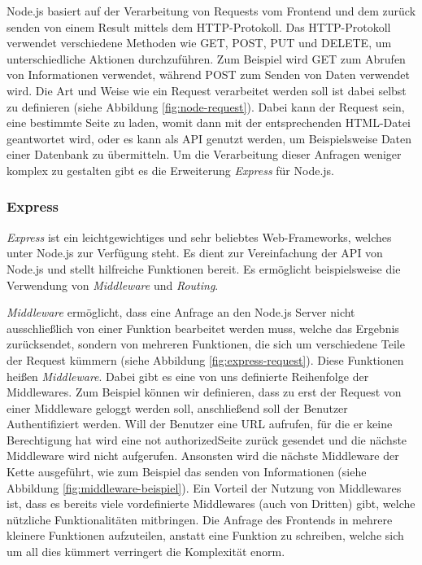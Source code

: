 \documentclass[a4paper,12pt]{report}
\newcommand{\footcite}[1]{\footnotemark\footnotetext{\cite{#1}}}
\begin{document}
Node.js basiert auf der Verarbeitung von Requests vom Frontend und dem zurück senden von einem Result mittels dem HTTP-Protokoll. Das HTTP-Protokoll verwendet verschiedene Methoden wie GET, POST, PUT und DELETE, um unterschiedliche Aktionen durchzuführen. Zum Beispiel wird GET zum Abrufen von Informationen verwendet, während POST zum Senden von Daten verwendet wird. Die Art und Weise wie ein Request verarbeitet werden soll ist dabei selbst zu definieren (siehe Abbildung \ref{fig:node-request}). Dabei kann der Request sein, eine bestimmte Seite zu laden, womit dann mit der entsprechenden HTML-Datei geantwortet wird, oder es kann als API genutzt werden, um Beispielsweise Daten einer Datenbank zu übermitteln. Um die Verarbeitung dieser Anfragen weniger komplex zu gestalten gibt es die Erweiterung \textit{Express} für Node.js.

\subsubsection{Express}
\label{sec:express}
\textit{Express} ist ein leichtgewichtiges und sehr beliebtes Web-Frameworks, welches unter Node.js zur Verfügung steht. Es dient zur Vereinfachung der API von Node.js und stellt hilfreiche Funktionen bereit\footcite{expressbook}. Es ermöglicht beispielsweise die Verwendung von \textit{Middleware} und \textit{Routing}.

\textit{Middleware} ermöglicht, dass eine Anfrage an den Node.js Server nicht ausschließlich von einer Funktion bearbeitet werden muss, welche das Ergebnis zurücksendet, sondern von mehreren Funktionen, die sich um verschiedene Teile der Request kümmern (siehe Abbildung \ref{fig:express-request}). Diese Funktionen heißen \textit{Middleware}. Dabei gibt es eine von uns definierte Reihenfolge der Middlewares. Zum Beispiel können wir definieren, dass zu erst der Request von einer Middleware geloggt werden soll, anschließend soll der Benutzer Authentifiziert werden. Will der Benutzer eine URL aufrufen, für die er keine Berechtigung hat wird eine \glqq not authorized\grqq{ }Seite zurück gesendet und die nächste Middleware wird nicht aufgerufen. Ansonsten wird die nächste Middleware der Kette ausgeführt, wie zum Beispiel das senden von Informationen (siehe Abbildung \ref{fig:middleware-beispiel}). Ein Vorteil der Nutzung von Middlewares ist, dass es bereits viele vordefinierte Middlewares (auch von Dritten) gibt, welche nützliche Funktionalitäten mitbringen. Die Anfrage des Frontends in mehrere kleinere Funktionen aufzuteilen, anstatt eine Funktion zu schreiben, welche sich um all dies kümmert verringert die Komplexität enorm.
\end{document}

